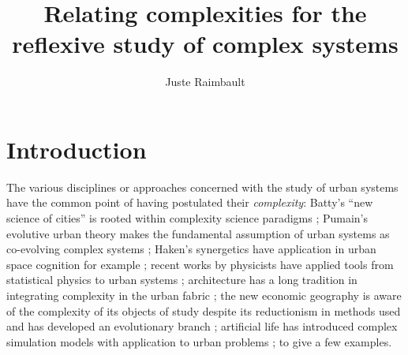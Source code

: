 

\title*{Relating complexities for the reflexive study of complex systems}
\author{Juste Raimbault}
%
%
\maketitle







\section{Introduction}


The various disciplines or approaches concerned with the study of urban systems have the common point of having postulated their \emph{complexity}: Batty's ``new science of cities'' is rooted within complexity science paradigms \cite{batty2007cities,batty2013new}; Pumain's evolutive urban theory makes the fundamental assumption of urban systems as co-evolving complex systems \cite{pumain2017geography,pumain1997pour}; Haken's synergetics have application in urban space cognition for example \cite{e18060197}; recent works by physicists have applied tools from statistical physics to urban systems \cite{west2017scale}; architecture has a long tradition in integrating complexity in the urban fabric \cite{alexander1977pattern}; the new economic geography is aware of the complexity of its objects of study despite its reductionism in methods used \cite{krugman1994complex} and has developed an evolutionary branch \cite{cooke2018evolutionary}; artificial life has introduced complex simulation models with application to urban problems \cite{raimbault2014hybrid}; to give a few examples.

